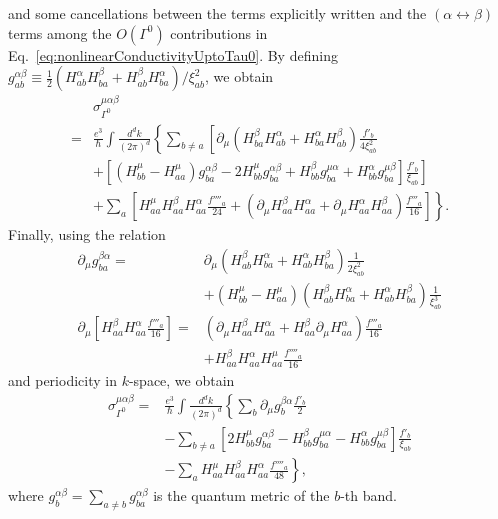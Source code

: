 \documentclass[twocolumn,superscriptaddress]{revtex4-1}
\begin{document}
and some cancellations between the terms explicitly written and the $(\alpha \leftrightarrow \beta)$ terms among the $O(\Gamma^0)$ contributions in Eq.~\eqref{eq:nonlinearConductivityUptoTau0}.
By defining $g_{ab}^{\alpha\beta}\equiv \frac{1}{2}(H_{ab}^\alpha H_{ba}^\beta +H_{ab}^\beta H_{ba}^\alpha)/{\xi_{ab}^2}$, we obtain
\begin{align}
  &\sigma_{\Gamma^0}^{\mu\alpha\beta}\nonumber \\
=&\frac{e^3}{\hbar}\int \frac{d^d k}{(2\pi)^d}\left\{\sum_{b\neq a}\left[\partial_\mu (H_{ba}^\beta H_{ab}^\alpha+H_{ba}^\alpha H_{ab}^\beta) \frac{f'_b}{4\xi_{ab}^2}\right.\right.\nonumber\\
  &\left.+\left[(H_{bb}^\mu-H_{aa}^\mu )g_{ba}^{\alpha\beta}-2H_{bb}^\mu g_{ba}^{\alpha\beta}+H_{bb}^\beta g_{ba}^{\mu\alpha}+H_{bb}^\alpha g_{ba}^{\mu\beta} \right]\frac{f'_b}{\xi_{ab}}\right] \nonumber\\
  &\left.+\sum_{a}\left[H_{aa}^\mu H_{aa}^\beta H_{aa}^\alpha \frac{f''''_a}{24}+ (\partial_\mu H_{aa}^{\beta} H_{aa}^\alpha +\partial_\mu H_{aa}^{\alpha} H_{aa}^\beta )\frac{f'''_a}{16}\right]\right\}.
\end{align}
Finally, using the relation
\begin{align}
    \partial_\mu g_{ba}^{\beta\alpha}=&\partial_\mu (H_{ab}^\beta H_{ba}^\alpha +H_{ab}^\alpha H_{ba}^\beta)\frac{1}{2\xi_{ab}^2}\nonumber \\
    &+(H_{bb}^\mu-H_{aa}^\mu)(H_{ab}^\beta H_{ba}^\alpha +H_{ab}^\alpha H_{ba}^\beta)\frac{1}{\xi_{ab}^3}\\
  \partial_\mu [H_{aa}^\beta H_{aa}^\alpha \frac{f'''_a}{16}]=&(\partial_\mu H_{aa}^\beta H_{aa}^\alpha +H_{aa}^\beta \partial_\mu H_{aa}^\alpha)\frac{f'''_a}{16}\nonumber \\
    &+H_{aa}^\beta H_{aa}^\alpha H_{aa}^\mu \frac{f''''_a}{16}
\end{align}
and periodicity in $k$-space, we obtain
\begin{align}
  \sigma_{\Gamma^0}^{\mu\alpha\beta}
=&\frac{e^3}{\hbar}\int \frac{d^d k}{(2\pi)^d}\left\{\sum_b \partial_\mu g_{b}^{\beta\alpha} \frac{f'_b}{2}\right.\nonumber\\
  &-\sum_{b\neq a}\left[2H_{bb}^\mu g_{ba}^{\alpha\beta}- H_{bb}^\beta g_{ba}^{\mu\alpha}- H_{bb}^\alpha g_{ba}^{\mu\beta} \right]\frac{f'_b}{\xi_{ab}} \nonumber\\
  &\left.-\sum_{a}H_{aa}^\mu H_{aa}^\beta H_{aa}^\alpha \frac{f''''_a}{48}\right\},
\end{align}
where $g_b^{\alpha\beta}=\sum_{a\neq b}g_{ba}^{\alpha\beta}$ is the quantum metric of the $b$-th band.
\end{document}
